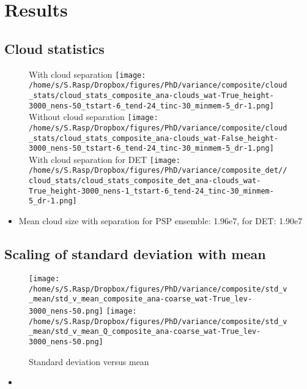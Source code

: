 \documentclass[a4paper, 12pt]{article}
\begin{document}
\newpage


\section{Results}

\subsection{Cloud statistics}
\begin{figure}[h!]
\noindent \centering
With cloud separation
\texttt{[image: /home/s/S.Rasp/Dropbox/figures/PhD/variance/composite/cloud\_stats/cloud\_stats\_composite\_ana-clouds\_wat-True\_height-3000\_nens-50\_tstart-6\_tend-24\_tinc-30\_minmem-5\_dr-1.png]}
Without cloud separation
\texttt{[image: /home/s/S.Rasp/Dropbox/figures/PhD/variance/composite/cloud\_stats/cloud\_stats\_composite\_ana-clouds\_wat-False\_height-3000\_nens-50\_tstart-6\_tend-24\_tinc-30\_minmem-5\_dr-1.png]}
With cloud separation for DET
\texttt{[image: /home/s/S.Rasp/Dropbox/figures/PhD/variance/composite\_det//cloud\_stats/cloud\_stats\_composite\_det\_ana-clouds\_wat-True\_height-3000\_nens-1\_tstart-6\_tend-24\_tinc-30\_minmem-5\_dr-1.png]}\\
\caption{} \label{fig:geographical}
\end{figure}
\begin{itemize}
 \item Mean cloud size with separation for PSP ensemble: 1.96e7, for DET: 1.90e7
\end{itemize}

\newpage


\subsection{Scaling of standard deviation with mean}
\begin{figure}[h!]
\noindent \centering
\texttt{[image: /home/s/S.Rasp/Dropbox/figures/PhD/variance/composite/std\_v\_mean/std\_v\_mean\_composite\_ana-coarse\_wat-True\_lev-3000\_nens-50.png]}
\texttt{[image: /home/s/S.Rasp/Dropbox/figures/PhD/variance/composite/std\_v\_mean/std\_v\_mean\_Q\_composite\_ana-coarse\_wat-True\_lev-3000\_nens-50.png]}\\
\caption{Standard deviation versus mean} \label{fig:geographical}
\end{figure}
\begin{itemize}
 \item 
\end{itemize}
\end{document}

